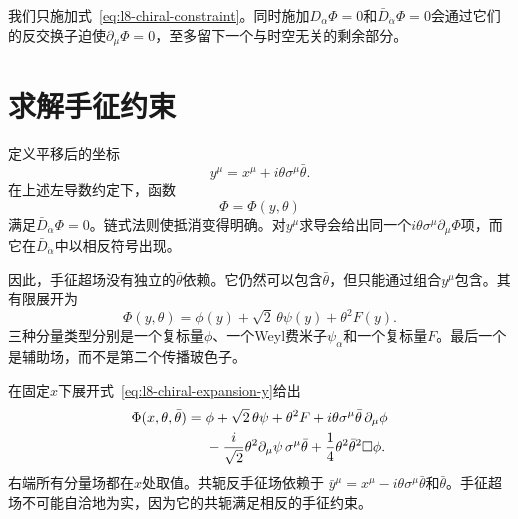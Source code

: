 \begin{classroomqa}
\end{classroomqa}

我们只施加式~\eqref{eq:l8-chiral-constraint}。同时施加\(D_\alpha\Phi=0\)和\(\bar D_{\dot\alpha}\Phi=0\)会通过它们的反交换子迫使\(\partial_\mu\Phi=0\)，至多留下一个与时空无关的剩余部分。

\section{求解手征约束}

定义平移后的坐标
\begin{equation}
y^\mu=x^\mu+i\theta\sigma^\mu\bar\theta.
\label{eq:l8-chiral-coordinate}
\end{equation}
在上述左导数约定下，函数
\begin{equation}
\Phi=\Phi(y,\theta)
\label{eq:l8-chiral-solution}
\end{equation}
满足\(\bar D_{\dot\alpha}\Phi=0\)。链式法则使抵消变得明确。对\(y^\mu\)求导会给出同一个\(i\theta\sigma^\mu\partial_\mu\Phi\)项，而它在\(\bar D_{\dot\alpha}\)中以相反符号出现。

因此，手征超场没有独立的\(\bar\theta\)依赖。它仍然可以包含\(\bar\theta\)，但只能通过组合\(y^\mu\)包含。其有限展开为
\begin{equation}
\Phi(y,\theta)
=\phi(y)+\sqrt2\,\theta\psi(y)+\theta^2F(y).
\label{eq:l8-chiral-expansion-y}
\end{equation}
三种分量类型分别是一个复标量\(\phi\)、一个Weyl费米子\(\psi_\alpha\)和一个复标量\(F\)。最后一个是辅助场，而不是第二个传播玻色子。

\begin{classroomqa}
\end{classroomqa}

在固定\(x\)下展开式~\eqref{eq:l8-chiral-expansion-y}给出
\begin{align}
\Phi(x,\theta,\bar\theta)
={}&\phi
+\sqrt2\,\theta\psi
+\theta^2F
+i\theta\sigma^\mu\bar\theta\,\partial_\mu\phi
\notag\\
&-\frac{i}{\sqrt2}\theta^2
\partial_\mu\psi\,\sigma^\mu\bar\theta
+\frac14\theta^2\bar\theta^2\Box\phi.
\label{eq:l8-chiral-expansion-x}
\end{align}
右端所有分量场都在\(x\)处取值。共轭反手征场依赖于
\(\bar y^\mu=x^\mu-i\theta\sigma^\mu\bar\theta\)和\(\bar\theta\)。手征超场不可能自洽地为实，因为它的共轭满足相反的手征约束。

